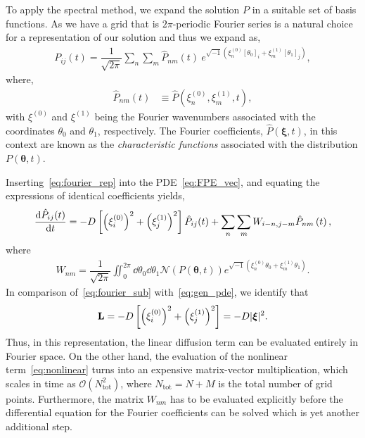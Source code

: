 \documentclass[10pt]{article}
\newcommand{\Phat}{\hat{P}}
\newcommand{\mN}{\bm{\mathcal{N}}}
\begin{document}
To apply the spectral method, we expand the solution $P$ in a suitable set of basis functions. As we have a grid that is $2\pi$-periodic Fourier series is a natural choice for a representation of our solution and thus we expand as,
\begin{align}
    P_{ij}(t) = \dfrac{1}{\sqrt{2\pi}}\sum\limits_{n}\sum\limits_{m}\Phat_{nm}(t)\ e^{\sqrt{-1}\left(\xi^{(0)}_{n}\left[\theta_{0}\right]_{i}+\xi^{(1)}_{m}\left[\theta_{1}\right]_{j}\right)},\label{eq:fourier_rep}
\end{align}
where, 
\begin{align}
    \Phat_{nm}(t) &\equiv \Phat\left(\xi^{(0)}_{n},\xi^{(1)}_{m},t\right),
\end{align}
with $\xi^{(0)}$ and $\xi^{(1)}$ being the Fourier wavenumbers associated with the coordinates $\theta_{0}$ and $\theta_{1}$, respectively. The Fourier coefficients, $\Phat(\bm{\xi},t)$, in this context are known as the \emph{characteristic functions} associated with the distribution $P(\bm{\theta},t)$.

Inserting~\eqref{eq:fourier_rep} into the PDE~\eqref{eq:FPE_vec}, and equating the expressions of identical coefficients yields,
\begin{align}
    \dv{\Phat_{ij}(t)}{t} = -D\left[\left(\xi^{(0)}_{i}\right)^{2} + \left(\xi^{(1)}_{j}\right)^{2}\right]\Phat_{ij}(t) + \sum\limits_{n}\sum\limits_{m}W_{i-n,j-    m}\Phat_{nm}\left(t\right),\label{eq:fourier_sub}
\end{align}
where 
\begin{align}
    W_{nm} = \dfrac{1}{\sqrt{2\pi}}\iint_{0}^{2\pi}\dd{\theta_{0}}\dd{\theta_{1}}\mN(P(\bm{\theta},t))e^{\sqrt{-1}\left(\xi^{(0)}_{n}\theta_{0}+\xi^{(1)}_{m}\theta_{1}\right)}.
\end{align}
In comparison of~\eqref{eq:fourier_sub} with~\eqref{eq:gen_pde}, we identify that 
\begin{align}
    \vb{L} = -D\left[\left(\xi^{(0)}_{i}\right)^{2} + \left(\xi^{(1)}_{j}\right)^{2}\right] = -D|\bm{\xi}|^{2}.
\end{align}
Thus, in this representation, the linear diffusion term can be evaluated entirely in Fourier space. On the other hand, the evaluation of the nonlinear term~\eqref{eq:nonlinear} turns into an expensive matrix-vector multiplication, which scales in time as $\mathcal{O}(N_{\mathrm{tot}}^{2})$, where $N_{\mathrm{tot}} = N + M$ is the total number of grid points.  Furthermore, the matrix $W_{nm}$ has to be evaluated explicitly before the differential equation for the Fourier coefficients can be solved which is yet another additional step. 
\end{document}

